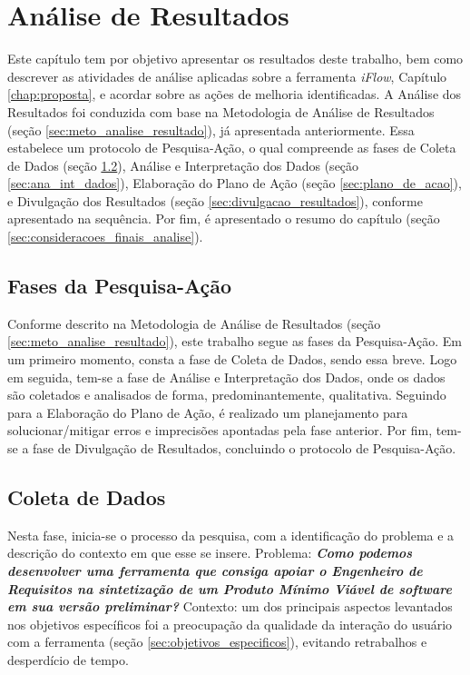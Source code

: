 \chapter[Análise de Resultados]{Análise de Resultados}

\label{chap:analise_resultados}
Este capítulo tem por objetivo apresentar os resultados deste trabalho, bem como descrever as atividades de análise aplicadas sobre a ferramenta \textit{iFlow}, Capítulo \ref{chap:proposta}, e acordar sobre as ações de melhoria identificadas. A Análise dos Resultados foi conduzida com base na Metodologia de Análise de Resultados (seção \ref{sec:meto_analise_resultado}), já apresentada anteriormente. Essa estabelece um protocolo de Pesquisa-Ação, o qual compreende as fases de Coleta de Dados (seção \ref{sec:coleta_de_dados}), Análise e Interpretação dos Dados (seção \ref{sec:ana_int_dados}), Elaboração do Plano de Ação (seção \ref{sec:plano_de_acao}), e Divulgação dos Resultados (seção \ref{sec:divulgacao_resultados}), conforme apresentado na sequência. Por fim, é apresentado o resumo do capítulo (seção \ref{sec:consideracoes_finais_analise}).

\section{Fases da Pesquisa-Ação}
Conforme descrito na Metodologia de Análise de Resultados (seção \ref{sec:meto_analise_resultado}), este trabalho segue as fases da Pesquisa-Ação. Em um primeiro momento, consta a fase de Coleta de Dados, sendo essa breve. Logo em seguida, tem-se a fase de Análise e Interpretação dos Dados, onde os dados são coletados e analisados de forma, predominantemente, qualitativa. Seguindo para a Elaboração do Plano de Ação, é realizado um planejamento para solucionar/mitigar erros e imprecisões apontadas pela fase anterior. Por fim, tem-se a fase de Divulgação de Resultados, concluindo o protocolo de Pesquisa-Ação.

\section{Coleta de Dados}
\label{sec:coleta_de_dados}
Nesta fase, inicia-se o processo da pesquisa, com a identificação do problema e a descrição do contexto em que esse se insere. Problema: \textit{\textbf{Como podemos desenvolver uma ferramenta que consiga apoiar o Engenheiro de Requisitos na sintetização de um Produto Mínimo Viável de \textit{software} em sua versão preliminar?}} Contexto: um dos principais aspectos levantados nos objetivos específicos foi a preocupação da qualidade da interação do usuário com a ferramenta (seção \ref{sec:objetivos_especificos}), evitando retrabalhos e desperdício de tempo.

